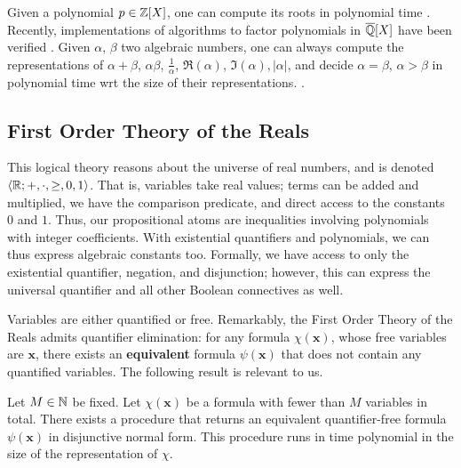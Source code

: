 Given a polynomial $p\in \mathbb{Z}[X]$, one can compute its roots in polynomial time \cite{findroots1operate1}. Recently, implementations of algorithms to factor polynomials in $\overline{\mathbb{Q}}[X]$ have been verified \cite{factor-algebraic}. Given $\alpha$, $\beta$ two algebraic numbers, one can always compute the representations of $\alpha+\beta$, $\alpha\beta$, $\frac 1 \alpha$, $\Re(\alpha)$, $\Im(\alpha), |\alpha|$, and decide $\alpha = \beta$, $\alpha > \beta$ in polynomial time wrt the size of their representations. \cite{findroots1operate1,findroots2operate2}.

\subsection{First Order Theory of the Reals}
This logical theory reasons about the universe of real numbers, and is denoted $\langle\mathbb{R}; +, \cdot, \ge, 0, 1\rangle$. That is, variables take real values; terms can be added and multiplied, we have the comparison predicate, and direct access to the constants $0$ and $1$. Thus, our propositional atoms are inequalities involving polynomials with integer coefficients. With existential quantifiers and polynomials, we can thus express algebraic constants too. Formally, we have access to only the existential quantifier, negation, and disjunction; however, this can express the universal quantifier and all other Boolean connectives as well.

Variables are either quantified or free. Remarkably, the First Order Theory of the Reals admits quantifier elimination: for any formula $\chi(\mathbf{x})$, whose free variables are $\mathbf{x}$, there exists an \textbf{equivalent} formula $\psi(\mathbf{x})$ that does not contain any quantified variables. The following result is relevant to us.
\begin{theorem}
\label{thm:renegar}
Let $M \in \mathbb{N}$ be fixed. Let $\chi(\mathbf{x})$ be a formula with fewer than $M$ variables in total. There exists a procedure that returns an equivalent quantifier-free formula $\psi(\mathbf{x})$ in disjunctive normal form. This procedure runs in time polynomial in the size of the representation of $\chi$.
\end{theorem} 